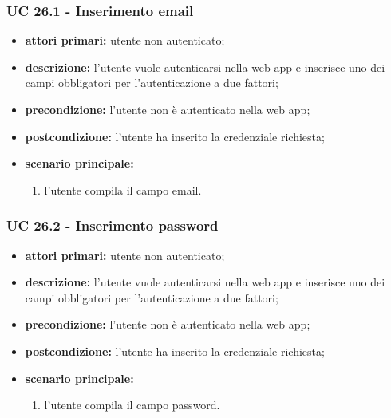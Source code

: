 		\subsubsection{UC 26.1 - Inserimento email}
		\begin{itemize}
			\item \textbf{attori primari:} utente non autenticato;
			\item \textbf{descrizione:} l'utente vuole autenticarsi nella web app e inserisce uno dei campi obbligatori per l'autenticazione a due fattori;
			\item \textbf{precondizione:} l'utente non è autenticato nella web app;
			\item \textbf{postcondizione:} l'utente ha inserito la credenziale richiesta;
			\item \textbf{scenario principale:}
			\begin{enumerate}
				\item l'utente compila il campo email.
			\end{enumerate}
		\end{itemize}
		
		\subsubsection{UC 26.2 - Inserimento password}
		\begin{itemize}
			\item \textbf{attori primari:} utente non autenticato;
			\item \textbf{descrizione:} l'utente vuole autenticarsi nella web app e inserisce uno dei campi obbligatori per l'autenticazione a due fattori;
			\item \textbf{precondizione:} l'utente non è autenticato nella web app;
			\item \textbf{postcondizione:} l'utente ha inserito la credenziale richiesta;
			\item \textbf{scenario principale:}
			\begin{enumerate}
				\item l'utente compila il campo password.
			\end{enumerate}
		\end{itemize}
		
